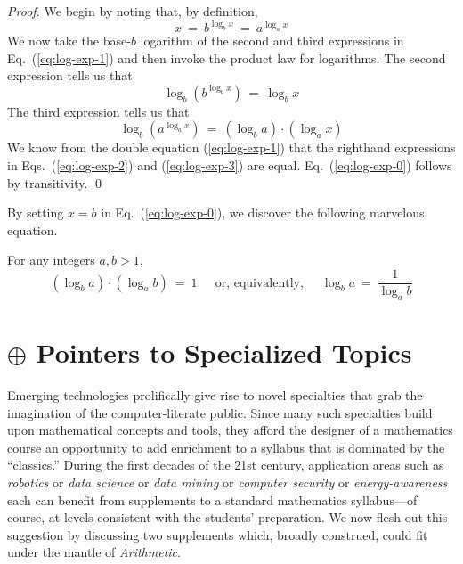 \begin{proof}
We begin by noting that, by definition,
\begin{equation}
\label{eq:log-exp-1}
 x \ = \ b^{\log_b x} \ = \ a^{\log_a x}
\end{equation}
We now take the base-$b$ logarithm of the second and third expressions in Eq.~(\ref{eq:log-exp-1}) and then invoke the product law for logarithms.  The second expression tells us that
\begin{equation}
\label{eq:log-exp-2}
 \log_b \left(b^{\log_b x} \right) \ = \ \log_b x
\end{equation}
The third expression tells us that
\begin{equation}
\label{eq:log-exp-3}
 \log_b \left( a^{\log_a x} \right) \ = \
\left(\log_b a \right) \cdot \left( \log_a x \right)
\end{equation}
We know from the double equation (\ref{eq:log-exp-1}) that the righthand expressions in Eqs.~(\ref{eq:log-exp-2}) and (\ref{eq:log-exp-3}) are equal.  Eq.~(\ref{eq:log-exp-0}) follows by transitivity.  \qed
\end{proof}

\noindent
By setting $x = b$ in Eq.~(\ref{eq:log-exp-0}), we discover the following marvelous equation.

\begin{prop}
For any integers $a, b >1$,
\begin{equation}
\left(\log_b a \right) \cdot \left( \log_a b \right) \ = \ 1 \ \ \ \ \
\mbox{ or, equivalently, } \ \ \ \ \
\log_b a \ = \ \frac{1}{\log_a b} 
\end{equation}
\end{prop}


\section{$\oplus$ Pointers to Specialized Topics}

Emerging technologies prolifically give rise to novel specialties that grab the imagination of the computer-literate public.  Since many such specialties build upon mathematical concepts and tools, they afford the designer of a mathematics course an opportunity to add enrichment to a syllabus that is dominated by the ``classics.''  During the first decades of the 21st century, application areas such as {\it robotics} or {\it data science} or {\it data mining} or {\it computer security} or {\it energy-awareness} each can benefit from supplements to a standard mathematics syllabus---of course, at levels consistent with the students' preparation.  We now flesh out this suggestion by discussing two supplements which, broadly construed, could fit under the mantle of {\it Arithmetic}.

